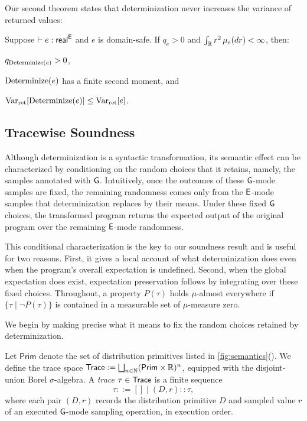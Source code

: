 Our second theorem states that determinization never increases the variance of returned values:
%
\begin{theorem}
\label{thm:variance}
Suppose $\vdash e:\mathsf{real}^{\mathsf{E}}$ and $e$ is domain-safe. If $q_e>0$ and
$\int_{\mathbb{R}}r^2\,\mu_{e}(dr)<\infty$, then:
%
\begin{enumerate*}
  \item $q_{\operatorname{Determinize}(e)}>0$,
  \item $\operatorname{Determinize}(e)$ has a finite second moment, and
  \item $\operatorname{Var}_{\mathrm{ret}}[\operatorname{Determinize}(e)] \leq\operatorname{Var}_{\mathrm{ret}}[e]$.
\end{enumerate*}

\end{theorem}



\subsection{Tracewise Soundness}
\label{sec:traces}

Although determinization is a syntactic transformation, its semantic
effect can be characterized by conditioning on the random choices that
it retains, namely, the samples annotated with $\mathsf{G}$. Intuitively, once
the outcomes of these $\mathsf{G}$-mode samples are fixed, the remaining
randomness comes only from the $\mathsf{E}$-mode samples that determinization
replaces by their means. Under these fixed $\mathsf{G}$ choices, the
transformed program returns the expected output of the original
program over the remaining $\mathsf{E}$-mode randomness.

This conditional characterization is the key to our soundness result and
is useful for two reasons. First, it gives a local account of what
determinization does even when the program's overall expectation is
undefined. Second, when the global expectation does exist, expectation
preservation follows by integrating over these fixed choices.
Throughout, a property $P(\tau)$ holds $\mu$-almost everywhere if
$\{\tau\mid\neg P(\tau)\}$ is contained in a measurable set of
$\mu$-measure zero.



We begin by making precise what it means to fix the random choices
retained by determinization.

\begin{definition}
Let $\mathsf{Prim}$ denote the set of distribution primitives listed in
\cref{fig:semantics}(). We define
the trace space
$\mathsf{Trace} := \bigsqcup_{n\in\mathbb N}(\mathsf{Prim}\times\mathbb{R})^n$,
equipped with the disjoint-union Borel $\sigma$-algebra.
A \emph{trace} $\tau\in\mathsf{Trace}$ is a finite sequence
\[
  \tau ::= [] \mid (D,r)::\tau,
\]
where each pair $(D,r)$ records the distribution primitive $D$ and
sampled value $r$ of an executed $\mathsf{G}$-mode sampling operation, in
execution order.
\end{definition}

